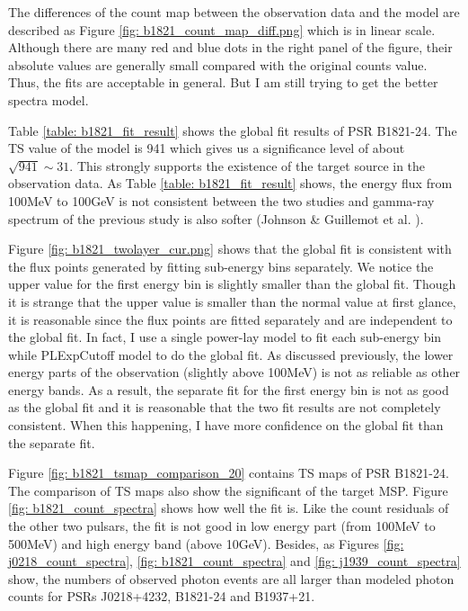 \documentclass[12pt]{report}
\begin{document}
      The differences of the count map between the observation data and the model are described 
      as Figure \ref{fig: b1821_count_map_diff.png} which is in linear scale. Although there are 
      many red and blue dots in the right panel of the figure, their absolute values are 
      generally small compared with the original counts value.
      Thus, the fits are acceptable in general. But I am still trying to get the better spectra 
      model. 

      Table \ref{table: b1821_fit_result} shows the global fit results of PSR B1821-24. 
      The TS value of the model is 941 which gives us a significance level 
      of about $\sqrt{941} \sim 31$. This strongly supports the existence of the target source in 
      the observation data. As Table \ref{table: b1821_fit_result} shows, the energy flux from 
      100MeV to 100GeV is not consistent between the two studies and gamma-ray spectrum of the 
      previous study is also softer (Johnson \& Guillemot et al. \cite{2013ApJ...778..106J}). 

      Figure \ref{fig: b1821_twolayer_cur.png} shows that the global fit is consistent with 
      the flux points generated by fitting sub-energy bins separately. We notice the upper value 
      for the first energy bin is slightly smaller than the global fit. 
      Though it is strange that the upper value is smaller than the normal value at first glance, 
      it is reasonable since the flux points are fitted separately and are independent to 
      the global fit. In fact, I use a single power-lay model to fit each sub-energy bin while 
      PLExpCutoff model to do the global fit. As discussed previously, the lower energy parts of 
      the observation (slightly above 100MeV) is not as reliable as other energy bands. As a result, the 
      separate fit for the first energy bin is not as good as the global fit and it is reasonable 
      that the two fit results are not completely consistent. When this happening, I have 
      more confidence on the global fit than the separate fit.
            
      Figure \ref{fig: b1821_tsmap_comparison_20} contains TS maps of PSR B1821-24. The 
      comparison of TS maps also show the significant of the target MSP. Figure 
      \ref{fig: b1821_count_spectra} shows how well the fit is. Like the count residuals of 
      the other two pulsars, the fit is not good in low energy part (from 100MeV to 500MeV)
      and high energy band (above 10GeV). Besides, as Figures \ref{fig: j0218_count_spectra},
      \ref{fig: b1821_count_spectra} and \ref{fig: j1939_count_spectra} show, the numbers of 
      observed photon events are all larger than modeled photon counts for PSRs J0218+4232, 
      B1821-24 and B1937+21. 
\end{document}
